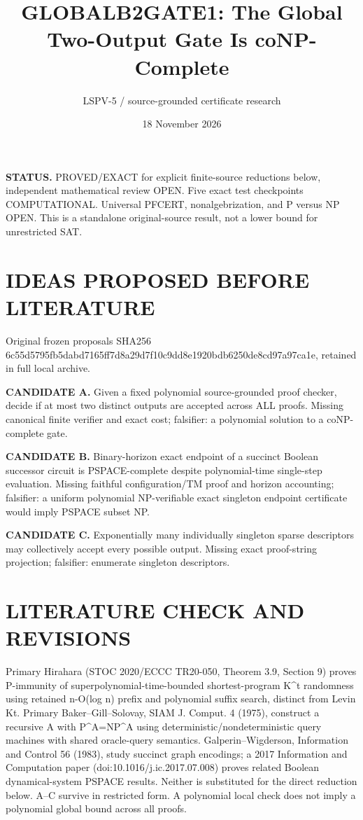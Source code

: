\documentclass[11pt]{article}
\title{GLOBALB2GATE1: The Global Two-Output Gate Is coNP-Complete}
\author{LSPV-5 / source-grounded certificate research}
\date{18 November 2026}
\begin{document}
\maketitle
\noindent\textbf{STATUS.} PROVED/EXACT for explicit finite-source reductions below, independent mathematical review OPEN. Five exact test checkpoints COMPUTATIONAL. Universal PFCERT, nonalgebrization, and P versus NP OPEN. This is a standalone original-source result, not a lower bound for unrestricted SAT.
\section{IDEAS PROPOSED BEFORE LITERATURE}
Original frozen proposals SHA256 6c55d5795fb5dabd7165ff7d8a29d7f10c9dd8e1920bdb6250de8cd97a97ca1e, retained in full local archive.
\par\textbf{CANDIDATE A.} Given a fixed polynomial source-grounded proof checker, decide if at most two distinct outputs are accepted across ALL proofs. Missing canonical finite verifier and exact cost; falsifier: a polynomial solution to a coNP-complete gate. 
\par\textbf{CANDIDATE B.} Binary-horizon exact endpoint of a succinct Boolean successor circuit is PSPACE-complete despite polynomial-time single-step evaluation. Missing faithful configuration/TM proof and horizon accounting; falsifier: a uniform polynomial NP-verifiable exact singleton endpoint certificate would imply PSPACE subset NP.
\par\textbf{CANDIDATE C.} Exponentially many individually singleton sparse descriptors may collectively accept every possible output. Missing exact proof-string projection; falsifier: enumerate singleton descriptors.
\section{LITERATURE CHECK AND REVISIONS}
Primary Hirahara (STOC 2020/ECCC TR20-050, Theorem 3.9, Section 9) proves P-immunity of superpolynomial-time-bounded shortest-program K^t randomness using retained n-O(log n) prefix and polynomial suffix search, distinct from Levin Kt. Primary Baker--Gill--Solovay, SIAM J. Comput. 4 (1975), construct a recursive A with P^A=NP^A using deterministic/nondeterministic query machines with shared oracle-query semantics. Galperin--Wigderson, Information and Control 56 (1983), study succinct graph encodings; a 2017 Information and Computation paper (doi:10.1016/j.ic.2017.07.008) proves related Boolean dynamical-system PSPACE results. Neither is substituted for the direct reduction below. A--C survive in restricted form. A polynomial local check does not imply a polynomial global bound across all proofs.
\end{document}
